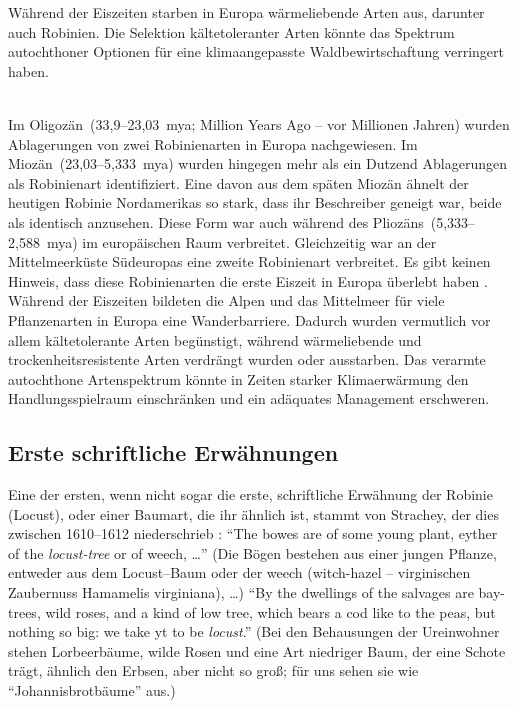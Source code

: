 \documentclass[twocolumn]{scrartcl}
\makeatletter
\newcommand{\summary}[1]{%
  \par %
  \noindent\textsf{\small #1}\\[-0.4em]
  \noindent\makebox[\linewidth]{\rule{0.33\linewidth}{0.4pt}}\\[-1.2em]
  \@afterindentfalse\@afterheading
}
\makeatother
\begin{document}
\summary{Während der Eiszeiten starben in Europa wärmeliebende Arten
  aus, darunter auch Robinien. Die Selektion kältetoleranter Arten
  könnte das Spektrum autochthoner Optionen für eine klimaangepasste
  Waldbewirtschaftung verringert haben.}

Im Oligozän~(33,9--23,03~mya; Million Years Ago -- vor
Millionen Jahren) wurden Ablagerungen von zwei Robinienarten in
Europa nachgewiesen. Im Miozän~(23,03--5,333~mya) wurden hingegen mehr
als ein Dutzend Ablagerungen als Robinienart identifiziert. Eine davon
aus dem späten Miozän ähnelt der heutigen Robinie Nordamerikas so
stark, dass ihr Beschreiber geneigt war, beide als identisch
anzusehen. Diese Form war auch während des Pliozäns~(5,333--2,588~mya)
im europäischen Raum verbreitet. Gleichzeitig war an der
Mittelmeerküste Südeuropas eine zweite Robinienart verbreitet. Es gibt
keinen Hinweis, dass diese Robinienarten die erste Eiszeit in Europa
überlebt haben \citep{berry1918robinie}. Während der Eiszeiten
bildeten die Alpen und das Mittelmeer für viele Pflanzenarten in
Europa eine Wanderbarriere. Dadurch wurden vermutlich vor allem
kältetolerante Arten begünstigt, während wärmeliebende und
trockenheitsresistente Arten verdrängt wurden oder ausstarben. Das
verarmte autochthone Artenspektrum könnte in Zeiten starker
Klimaerwärmung den Handlungsspielraum einschränken und ein adäquates
Management erschweren.

\subsection{Erste schriftliche Erwähnungen}

Eine der ersten, wenn nicht sogar die erste, schriftliche Erwähnung der Robinie
(Locust), oder einer Baumart, die ihr ähnlich ist, stammt von Strachey, der dies
zwischen 1610--1612 niederschrieb \citep{strachey1610-1612historie}:
\enquote{The bowes are of some young plant, eyther of the \emph{locust-tree} or
of weech, \dots} (Die Bögen bestehen aus einer jungen Pflanze, entweder aus dem
Locust--Baum oder der weech (witch-hazel -- virginischen Zaubernuss Hamamelis
virginiana), \dots) \enquote{By the dwellings of the salvages are bay-trees,
wild roses, and a kind of low tree, which bears a cod like to the peas, but
nothing so big: we take yt to be \emph{locust}.} (Bei den Behausungen der
Ureinwohner stehen Lorbeerbäume, wilde Rosen und eine Art niedriger Baum, der
eine Schote trägt, ähnlich den Erbsen, aber nicht so groß; für uns sehen sie wie
\enquote{Johannisbrotbäume} aus.)
\end{document}
